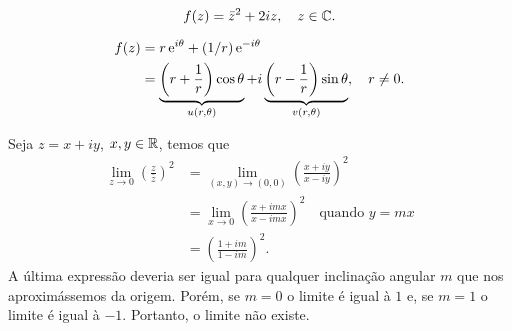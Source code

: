 \begin{questions}
\begin{solution}
\[f(z) = \bar{z}^2 + 2 i z, \quad z\in{\mathbb C}.\]
\end{solution}


\begin{solution}
    \begin{align*}
        f(z) &= r\,\mathrm{e}^{i\theta} + (1/r)\,\mathrm{e}^{-i\theta} \\
            &= \underbrace{\left(r+\frac{1}{r}\right)\cos\theta}_{u(r,\theta)} +
                i \underbrace{\left(r-\frac{1}{r}\right)\sin\theta}_{v(r,\theta)},
                \quad r\neq 0.
    \end{align*}
\end{solution}


\begin{solution}
    Seja $z = x+iy$, $x,y\in{\mathbb R}$, temos que
    \begin{align*}
        \lim_{z \to 0} \left( \frac{z}{\bar z} \right)^2
            &= \lim_{(x,y) \to (0,0)} \left( \frac{x+iy}{x-iy} \right)^2 \\
            &= \lim_{x\to 0} \left( \frac{x+imx}{x-imx} \right)^2\quad\text{quando } y = mx \\
            &= \left( \frac{1+im}{1-im} \right)^2.
    \end{align*}
    A última expressão deveria ser igual para qualquer inclinação angular $m$ que nos aproximássemos da origem. Porém, se $m=0$ o limite é igual à $1$ e, se $m=1$ o limite é igual à $-1$. Portanto, o limite não existe.
\end{solution}


\end{questions}
